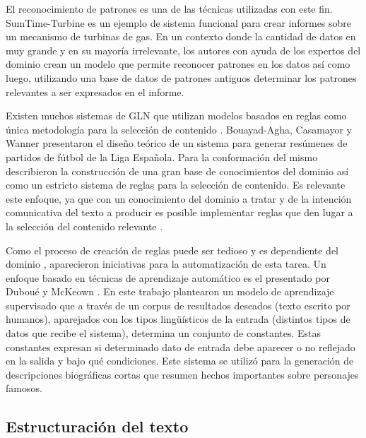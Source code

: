     El reconocimiento de patrones es una de las t\'ecnicas utilizadas con este fin.  SumTime-Turbine  es un ejemplo de sistema funcional para crear
 informes sobre un mecanismo de turbinas de gas. En un contexto donde la cantidad de datos en muy grande y en su mayoría irrelevante, 
 los autores con ayuda de los expertos del dominio crean un modelo que permite reconocer patrones en los datos así como luego, utilizando una base de datos de patrones 
antiguos determinar los patrones relevantes a ser expresados en el informe. 

    Existen muchos sistemas de GLN que utilizan modelos basados en reglas como \'unica metodolog\'ia para la selecci\'on de contenido . Bouayad-Agha, Casamayor y 
Wanner  presentaron el dise\~no te\'orico de un sistema para generar resúmenes de partidos de 
fútbol de la Liga Espa\~nola. Para la conformaci\'on del mismo describieron la construcci\'on de una gran base de conocimientos del dominio as\'i como 
un estricto sistema de reglas para la selecci\'on de contenido. Es relevante este enfoque, ya que con un conocimiento del dominio a tratar y de la intenci\'on comunicativa del texto a producir 
es posible implementar reglas que den lugar a la selección del contenido relevante . 

    Como el proceso de creaci\'on de reglas puede ser tedioso y es dependiente del dominio , aparecieron iniciativas para la automatizaci\'on de esta tarea. Un enfoque 
basado en t\'ecnicas de aprendizaje autom\'atico es el presentado por Dubou\'e y McKeown . En este trabajo plantearon un modelo de aprendizaje supervisado que a trav\'es de
un corpus de resultados deseados (texto escrito por humanos), aparejados con los tipos lingüísticos de la entrada (distintos tipos de datos que recibe el sistema), determina un conjunto de constantes. Estas constantes 
expresan si determinado dato de entrada debe aparecer o no reflejado en la salida y bajo qué condiciones. Este sistema se utilizó para la generación de descripciones biográficas cortas que resumen hechos 
importantes sobre personajes famosos.

\subsection{Estructuración del texto}\label{subsection:estructuracion}

